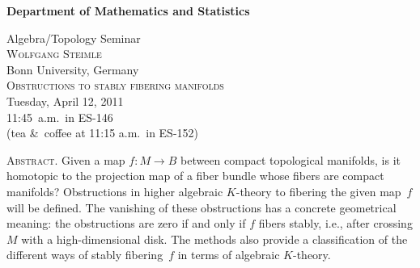 \documentclass[12pt]{article}
\begin{document}
\noindent\hspace{-28px}%
\hfill\textsf{\textbf{\footnotesize%
Department of Mathematics and Statistics}}\bigskip\bigskip

\begin{center}\Large
  \textsf{{\huge Algebra/Topology Seminar}}\\[2.5\bigskipamount]
  \textsc{Wolfgang Steimle}\\
  {\large Bonn University, Germany}\\[\bigskipamount]
  \textsc{Obstructions to stably fibering manifolds}\\[2\bigskipamount]
  Tuesday, April 12, 2011\\ 11:45~a.m.\ in ES-146\\
  (tea \&\ coffee at 11:15 a.m.\ in ES-152)
\end{center}\bigskip\bigskip

\large\noindent\textsc{Abstract.}
Given a map $f\colon M \to B$ between compact topological manifolds, is it homotopic to the projection map of a fiber bundle whose fibers are compact manifolds? Obstructions in higher algebraic $K$-theory to fibering the given map~$f$ will be defined. The vanishing of these obstructions has a concrete geometrical meaning: the obstructions are zero if and only if $f$ fibers stably, i.e., after crossing $M$ with a high-dimensional disk. The methods also provide a classification of the different ways of stably fibering~$f$ in terms of algebraic $K$-theory.
\end{document}
